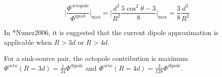 \begin{equation*}
\big| \frac{\Phi^{\mathrm{octopole}}}{\Phi^{\mathrm{quad}}} \big|_{\mathrm{max}} = \big|\frac{d^2}{R^2} \frac{5 \cos^2 \theta - 3}{8}\big|_{\mathrm{max}} = \frac{3}{8} \frac{d^2}{R^2}
\end{equation*}

In \citeasnoun**{Nunez2006}, it is suggested that the current dipole approximation is applicable when $R > 3d$ or $R > 4d$.

For a sink-source pair, the octopole contribution is maximum $\Phi^{\mathrm{octo}}(R = 3d) = \frac{1}{24} \Phi^{\mathrm{dipole}}$ and $\Phi^{\mathrm{octo}}(R = 4d) = \frac{3}{128} \Phi^{\mathrm{dipole}}$.

%	
%	
%	
%	

